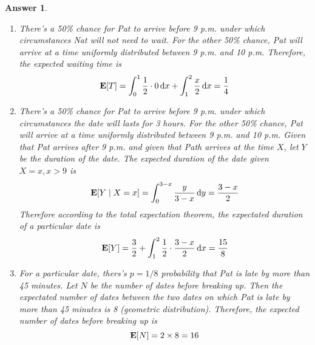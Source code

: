 \documentclass[utf8]{article}
\theoremstyle{definition}%
\theoremstyle{plain}%
\newtheorem{answer}{Answer} %
\begin{document}
\begin{answer} ~ 
    \begin{enumerate}[label=(\alph*)]
        \item There's a 50\% chance for Pat to arrive before 9 p.m. under which circumstances Nat will not need to wait. For the other 50\% chance, Pat will arrive at a time uniformly distributed between 9 p.m. and 10 p.m. Therefore, the expected waiting time is
        \begin{equation}
            \mathbf{E}[T] = \int_{0}^{1} \frac{1}{2} \cdot 0 \dd{x} + \int_{1}^{2} \frac{x}{2} \dd{x} = \frac{1}{4}
        \end{equation}
        \item There's a 50\% chance for Pat to arrive before 9 p.m. under which circumstances the date will lasts for 3 hours. For the other 50\% chance, Pat will arrive at a time uniformly distributed between 9 p.m. and 10 p.m. Given that Pat arrives after 9 p.m. and given that Path arrives at the time $X$, let $Y$ be the duration of the date. The expected duration of the date given $X = x, x > 9$ is
        \begin{equation}
            \mathbf{E}[Y \mid X = x] = \int_{0}^{3-x} \frac{y}{3 - x} \dd{y} = \frac{3 - x}{2}
        \end{equation}
        Therefore according to the total expectation theorem, the expectated duration of a particular date is
        \begin{equation}
            \mathbf{E}[Y] = \frac{3}{2} + \int_{1}^{2} \frac{1}{2} \cdot \frac{3 - x}{2} \dd{x} = \frac{15}{8}
        \end{equation}
        \item For a particular date, thers's $p = 1/8$ probability that Pat is late by more than 45 minutes. Let $N$  be the number of dates before breaking up. Then the expectated number of dates between the two dates on which Pat is late by more than 45 minutes is 8 (geometric distribution). Therefore, the expected number of dates before breaking up is
        \begin{equation}
            \mathbf{E}[N] = 2 \times 8 = 16
        \end{equation}
    \end{enumerate}
\end{answer}
\end{document}

